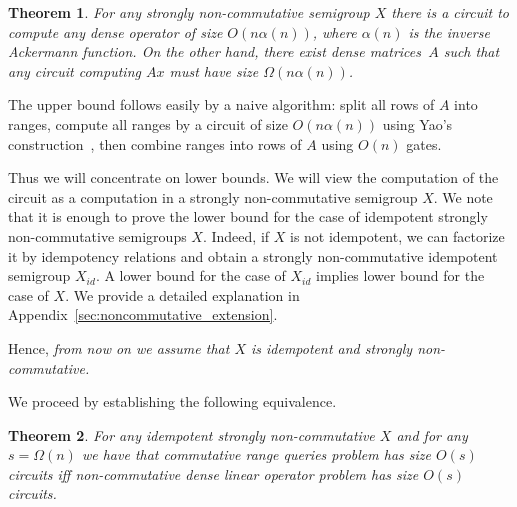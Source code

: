 \documentclass[11pt,letterpaper]{article}
\newtheorem{theorem}{Theorem}
\begin{document}

\begin{theorem}\label{thm:noncommlowerbound}
For any strongly non-commutative semigroup $X$ there is a circuit to compute any dense operator of size $O(n\alpha(n))$, where $\alpha(n)$ is the inverse Ackermann function. On the other hand, there exist dense matrices~$A$ such that any circuit computing $Ax$ must have size $\Omega(n\alpha(n))$.
\end{theorem}

The upper bound follows easily by a naive algorithm: split all rows of $A$ into ranges, compute all ranges by a circuit of size $O(n\alpha(n))$ using Yao's construction~\cite{DBLP:conf/stoc/Yao82}, then combine ranges into rows of $A$ using $O(n)$ gates.

Thus we will concentrate on lower bounds. We will view the computation of the circuit as a computation in a strongly non-commutative semigroup $X$. We note that it is enough to prove the lower bound for the case of idempotent strongly non-commutative semigroups $X$. Indeed, if $X$ is not idempotent, we can factorize it by idempotency relations and obtain a strongly non-commutative idempotent semigroup $X_{id}$. A lower bound for the case of $X_{id}$ implies lower bound for the case of $X$. We provide a detailed explanation in Appendix~\ref{sec:noncommutative_extension}.

Hence, {\em from now on we assume that $X$ is idempotent and strongly non-commutative.}

We proceed by establishing the following equivalence.

\begin{theorem}\label{thm:equivalence}
For any idempotent strongly non-commutative $X$ and for any $s=\Omega(n)$ we have that commutative range queries problem has size $O(s)$ circuits iff non-commutative dense linear operator problem has size $O(s)$ circuits.
\end{theorem}
\end{document}
